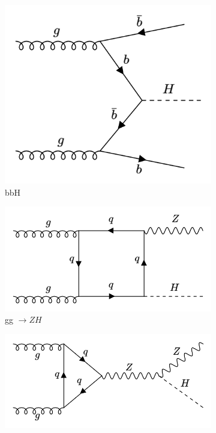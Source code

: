 \begin{figure}[htp]
  \centering
       \begin{subfigure}[b]{0.3\textwidth}
         \centering
         \includegraphics[width=\textwidth]{figures/theory_chapter/bbH.png}
         \caption{bbH}
         \label{fig:bbH}
     \end{subfigure}
     \hfill
         \begin{subfigure}[b]{0.3\textwidth}
         \centering
         \includegraphics[width=\textwidth]{figures/theory_chapter/ggZH.png}
         \caption{gg $\rightarrow ZH$ }
         \label{fig:ggZH}
     \end{subfigure}
     \hfill
         \begin{subfigure}[b]{0.3\textwidth}
         \centering
         \includegraphics[width=\textwidth]{figures/theory_chapter/ggZH2.png}

\end{subfigure}
\end{figure}
